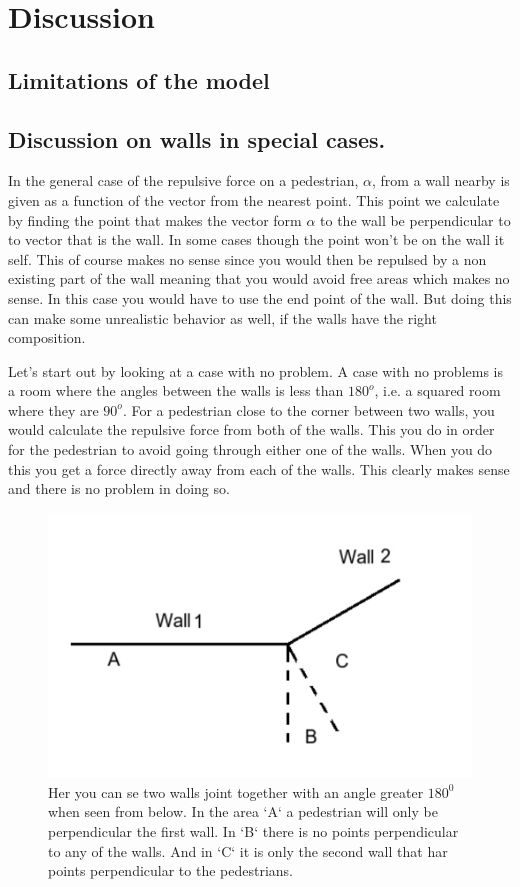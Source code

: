 \section{Discussion}\label{sec:discussion}
\subsection{Limitations of the model}

\subsection{Discussion on walls in special cases.}
In the general case of the repulsive force on a pedestrian, $\alpha$, from a wall nearby is given as a function of the vector from the nearest point. This point we calculate by finding the point that makes the vector form $\alpha$ to the wall be perpendicular to to vector that is the wall. In some cases though the point won't be on the wall it self. This of course makes no sense since you would then be repulsed by a non existing part of the wall meaning that you would avoid free areas which makes no sense. In this case you would have to use the end point of the wall. But doing this can make some unrealistic behavior as well, if the walls have the right composition. 

Let's start out by looking at a case with no problem. A case with no problems is a room where the angles between the walls is less than $180^o$, i.e. a squared room where they are $90^o$. For a pedestrian close to the corner between two walls, you would calculate the repulsive force from both of the walls. This you do in order for the pedestrian to avoid going through either one of the walls. When you do this you get a force directly away from each of the walls. This clearly makes sense and there is no problem in doing so.

\begin{figure}
\centering
\includegraphics[scale=0.5]{figures/Thewall.pdf}
\caption{Her you can se two walls joint together with an angle greater $180^0$ when seen from below. In the area `A` a pedestrian will only be perpendicular the first wall. In `B` there is no points perpendicular to any of the walls. And in `C` it is only the second wall that har points perpendicular to the pedestrians.  }
\label{fig:wallcase}
\end{figure}

